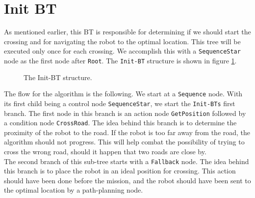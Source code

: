\section{Init BT}
\label{sec:Init-BT}
    As mentioned earlier, this BT is responsible for determining if we should start the crossing and for navigating the robot to the optimal location. This tree will be executed only once for each crossing. We accomplish this with a \texttt{SequenceStar} node as the first node after \texttt{Root}. The \texttt{Init-BT} structure is shown in figure \ref{fig:Init-BT}.\\
    \begin{figure}[ht]
        \caption{The Init-BT structure.}
        \label{fig:Init-BT}
    \end{figure}
    The flow for the algorithm is the following. We start at a \texttt{Sequence} node. With its first child being a control node \texttt{SequenceStar}, we start the \texttt{Init-BTs} first branch. The first node in this branch is an action node \texttt{GetPosition} followed by a condition node \texttt{CrossRoad}. The idea behind this branch is to determine the proximity of the robot to the road. If the robot is too far away from the road, the algorithm should not progress. This will help combat the possibility of trying to cross the wrong road, should it happen that two roads are close by.\\
    The second branch of this sub-tree starts with a \texttt{Fallback} node. The idea behind this branch is to place the robot in an ideal position for crossing. This action should have been done before the mission, and the robot should have been sent to the optimal location by a path-planning node.\\
